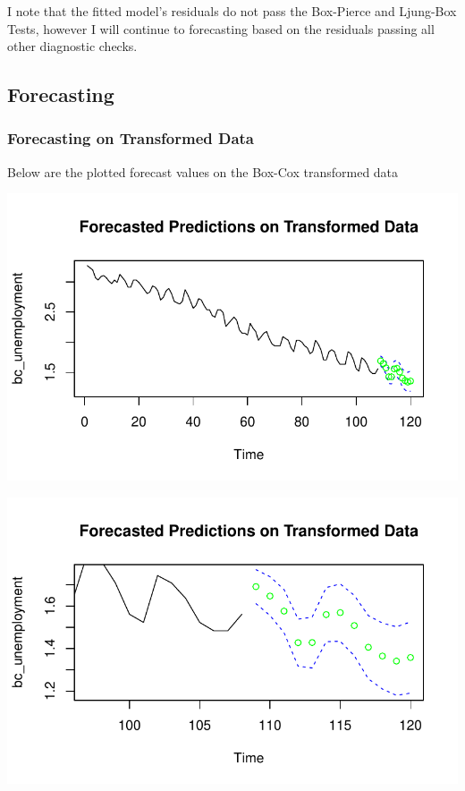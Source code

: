 \documentclass[
  letterpaper,
  DIV=11,
  numbers=noendperiod]{scrartcl}
\begin{document}
I note that the fitted model's residuals do not pass the Box-Pierce and
Ljung-Box Tests, however I will continue to forecasting based on the
residuals passing all other diagnostic checks.

\hypertarget{forecasting}{%
\subsection{Forecasting}\label{forecasting}}

\hypertarget{forecasting-on-transformed-data}{%
\subsubsection{Forecasting on Transformed
Data}\label{forecasting-on-transformed-data}}

Below are the plotted forecast values on the Box-Cox transformed data

\includegraphics{Final_Project_files/figure-pdf/unnamed-chunk-36-1.pdf}

\includegraphics{Final_Project_files/figure-pdf/unnamed-chunk-36-2.pdf}
\end{document}
